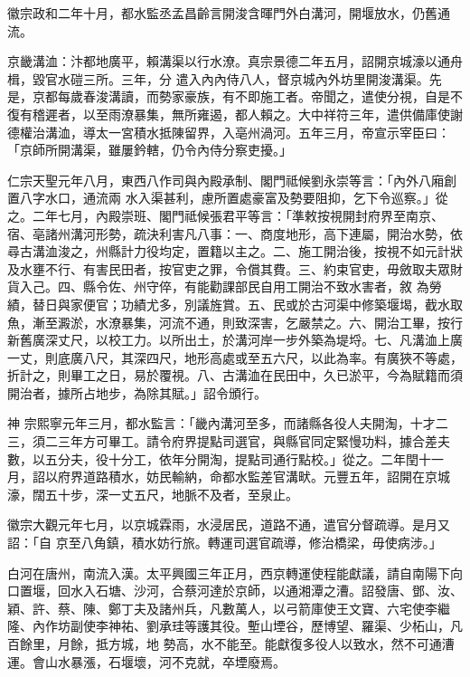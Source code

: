 \begin{pinyinscope}
 徽宗政和二年十月，都水監丞孟昌齡言開浚含暉門外白溝河，開堰放水，仍舊通流。



 京畿溝洫：汴都地廣平，賴溝渠以行水潦。真宗景德二年五月，詔開京城濠以通舟楫，毀官水磑三所。三年，分
 遣入內內侍八人，督京城內外坊里開浚溝渠。先是，京都每歲春浚溝讀，而勢家豪族，有不即施工者。帝聞之，遣使分視，自是不復有稽遲者，以至雨潦暴集，無所雍遏，都人賴之。大中祥符三年，遣供備庫使謝德權治溝洫，導太一宮積水抵陳留界，入亳州渦河。五年三月，帝宣示宰臣曰：「京師所開溝渠，雖屢鈐轄，仍令內侍分察吏擾。」



 仁宗天聖元年八月，東西八作司與內殿承制、閣門祗候劉永崇等言：「內外八廂創置八字水口，通流兩
 水入渠甚利，慮所置處豪富及勢要阻抑，乞下令巡察。」從之。二年七月，內殿崇班、閣門祗候張君平等言：「準敕按視開封府界至南京、宿、亳諸州溝河形勢，疏決利害凡八事：一、商度地形，高下連屬，開治水勢，依尋古溝洫浚之，州縣計力役均定，置籍以主之。二、施工開治後，按視不如元計狀及水壅不行、有害民田者，按官吏之罪，令償其費。三、約束官吏，毋斂取夫眾財貨入己。四、縣令佐、州守倅，有能勸課部民自用工開治不致水害者，敘
 為勞績，替日與家便官；功績尤多，別議旌賞。五、民或於古河渠中修築堰堨，截水取魚，漸至澱淤，水潦暴集，河流不通，則致深害，乞嚴禁之。六、開治工畢，按行新舊廣深丈尺，以校工力。以所出土，於溝河岸一步外築為堤埒。七、凡溝洫上廣一丈，則底廣八尺，其深四尺，地形高處或至五六尺，以此為率。有廣狹不等處，折計之，則畢工之日，易於覆視。八、古溝洫在民田中，久已淤平，今為賦籍而須開治者，據所占地步，為除其賦。」詔令頒行。



 神
 宗熙寧元年三月，都水監言：「畿內溝河至多，而諸縣各役人夫開淘，十才二三，須二三年方可畢工。請令府界提點司選官，與縣官同定緊慢功料，據合差夫數，以五分夫，役十分工，依年分開淘，提點司通行點校。」從之。二年閏十一月，詔以府界道路積水，妨民輸納，命都水監差官溝畎。元豐五年，詔開在京城濠，闊五十步，深一丈五尺，地脈不及者，至泉止。



 徽宗大觀元年七月，以京城霖雨，水浸居民，道路不通，遣官分督疏導。是月又詔：「自
 京至八角鎮，積水妨行旅。轉運司選官疏導，修治橋梁，毋使病涉。」



 白河在唐州，南流入漢。太平興國三年正月，西京轉運使程能獻議，請自南陽下向口置堰，回水入石塘、沙河，合蔡河達於京師，以通湘潭之漕。詔發唐、鄧、汝、穎、許、蔡、陳、鄭丁夫及諸州兵，凡數萬人，以弓箭庫使王文寶、六宅使李繼隆、內作坊副使李神祐、劉承珪等護其役。塹山堙谷，歷博望、羅渠、少柘山，凡百餘里，月餘，抵方城，地
 勢高，水不能至。能獻復多役人以致水，然不可通漕運。會山水暴漲，石堰壞，河不克就，卒堙廢焉。




\end{pinyinscope}
